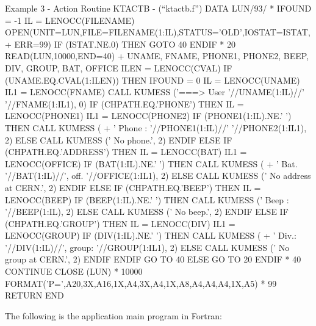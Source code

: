 \begin{XMPt} {Example 3 - Action Routine KTACTB - (``ktactb.f'')}
      DATA LUN/93/
*
      IFOUND = -1 
      IL = LENOCC(FILENAME)
      OPEN(UNIT=LUN,FILE=FILENAME(1:IL),STATUS='OLD',IOSTAT=ISTAT, 
     +     ERR=99)
      IF (ISTAT.NE.0) THEN
         GOTO 40
      ENDIF
*
   20 READ(LUN,10000,END=40)
     +     UNAME, FNAME, PHONE1, PHONE2, BEEP, DIV, GROUP, BAT, OFFICE
      ILEN = LENOCC(CVAL)\vspace{7pt}
      IF (UNAME.EQ.CVAL(1:ILEN)) THEN
          IFOUND = 0
          IL = LENOCC(UNAME)
          IL1 = LENOCC(FNAME)
          CALL KUMESS ('===> User '//UNAME(1:IL)//' '//FNAME(1:IL1), 0)
          IF (CHPATH.EQ.'PHONE') THEN
              IL = LENOCC(PHONE1)
              IL1 = LENOCC(PHONE2)
              IF (PHONE1(1:IL).NE.' ') THEN
                  CALL KUMESS (
     +            '     Phone : '//PHONE1(1:IL)//'  '//PHONE2(1:IL1), 2)
              ELSE
                  CALL KUMESS ('     No phone.', 2)
              ENDIF
          ELSE IF (CHPATH.EQ.'ADDRESS') THEN
              IL = LENOCC(BAT)
              IL1 = LENOCC(OFFICE)
              IF (BAT(1:IL).NE.' ') THEN
                  CALL KUMESS (
     +            '     Bat. '//BAT(1:IL)//', off. '//OFFICE(1:IL1), 2)
              ELSE
                  CALL KUMESS ('     No address at CERN.', 2)
              ENDIF
          ELSE IF (CHPATH.EQ.'BEEP') THEN
              IL = LENOCC(BEEP)
              IF (BEEP(1:IL).NE.' ') THEN
                  CALL KUMESS ('     Beep : '//BEEP(1:IL), 2)
              ELSE
                  CALL KUMESS ('     No beep.', 2)
              ENDIF
          ELSE IF (CHPATH.EQ.'GROUP') THEN
              IL = LENOCC(DIV)
              IL1 = LENOCC(GROUP)
              IF (DIV(1:IL).NE.' ') THEN
                  CALL KUMESS (
     +            '     Div.: '//DIV(1:IL)//', group: '//GROUP(1:IL1), 2)
              ELSE
                  CALL KUMESS ('     No group at CERN.', 2)
              ENDIF
          ENDIF
          GO TO 40
      ELSE
          GO TO 20
      ENDIF
*
   40 CONTINUE
      CLOSE (LUN)
*
10000 FORMAT('P=',A20,3X,A16,1X,A4,3X,A4,1X,A8,A4,A4,A4,1X,A5)
*
 99   RETURN
      END
\end{XMPt}

The following is the application main program in Fortran:

